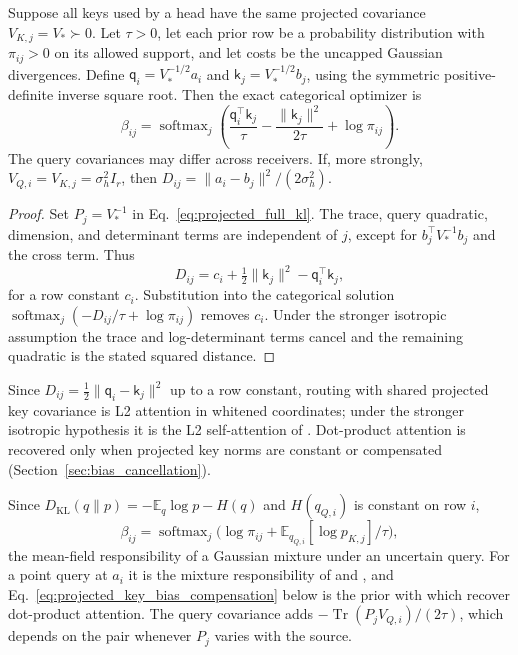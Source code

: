 \documentclass[twoside,11pt]{article}
\newcommand{\softmax}{\operatorname{softmax}}
\begin{document}
\begin{proposition}
\label{prop:projected_dot_product}
Suppose all keys used by a head have the same projected covariance $V_{K,j}=V_*\succ0$. Let $\tau>0$, let each prior row be a probability distribution with $\pi_{ij}>0$ on its allowed support, and let costs be the uncapped Gaussian divergences. Define $\mathsf q_i=V_*^{-1/2}a_i$ and $\mathsf k_j=V_*^{-1/2}b_j$, using the symmetric positive-definite inverse square root. Then the exact categorical optimizer is
\begin{equation}
\beta_{ij}=\softmax_j\left(
\frac{\mathsf q_i^\top\mathsf k_j}{\tau}
-\frac{\|\mathsf k_j\|^2}{2\tau}
+\log\pi_{ij}\right).
\label{eq:main_dot_product_scope}
\end{equation}
The query covariances may differ across receivers. If, more strongly, $V_{Q,i}=V_{K,j}=\sigma_h^2I_r$, then $D_{ij}=\|a_i-b_j\|^2/(2\sigma_h^2)$.
\end{proposition}
\begin{proof}
Set $P_j=V_*^{-1}$ in Eq.~\eqref{eq:projected_full_kl}. The trace, query quadratic, dimension, and determinant terms are independent of $j$, except for $b_j^\top V_*^{-1}b_j$ and the cross term. Thus
\begin{equation}
D_{ij}=c_i+\tfrac12\|\mathsf k_j\|^2
-\mathsf q_i^\top\mathsf k_j,
\label{eq:projected_kl_row_decomposition}
\end{equation}
for a row constant $c_i$. Substitution into the categorical solution $\softmax_j(-D_{ij}/\tau+\log\pi_{ij})$ removes $c_i$. Under the stronger isotropic assumption the trace and log-determinant terms cancel and the remaining quadratic is the stated squared distance.
\end{proof}
Since $D_{ij}=\tfrac12\|\mathsf q_i-\mathsf k_j\|^2$ up to a row constant, routing with shared projected key covariance is L2 attention in whitened coordinates; under the stronger isotropic hypothesis it is the L2 self-attention of \citet{Kim2021Lipschitz}. Dot-product attention is recovered only when projected key norms are constant or compensated (Section~\ref{sec:bias_cancellation}).

\begin{remark}
Since $D_{\mathrm{KL}}(q\|p)=-\mathbb E_q\log p-H(q)$ and $H(q_{Q,i})$ is constant on row $i$,
\begin{equation}
\beta_{ij}=\softmax_j\bigl(\log\pi_{ij}+\mathbb E_{q_{Q,i}}[\log p_{K,j}]/\tau\bigr),
\end{equation}
the mean-field responsibility of a Gaussian mixture under an uncertain query. For a point query at $a_i$ it is the mixture responsibility of \citet{Movellan2020ProbabilisticTransformers} and \citet{Nguyen2022MGK}, and Eq.~\eqref{eq:projected_key_bias_compensation} below is the prior with which \citet[Eqs.~16 to 21]{Movellan2020ProbabilisticTransformers} recover dot-product attention. The query covariance adds $-\operatorname{Tr}(P_jV_{Q,i})/(2\tau)$, which depends on the pair whenever $P_j$ varies with the source.
\end{remark}
\end{document}
